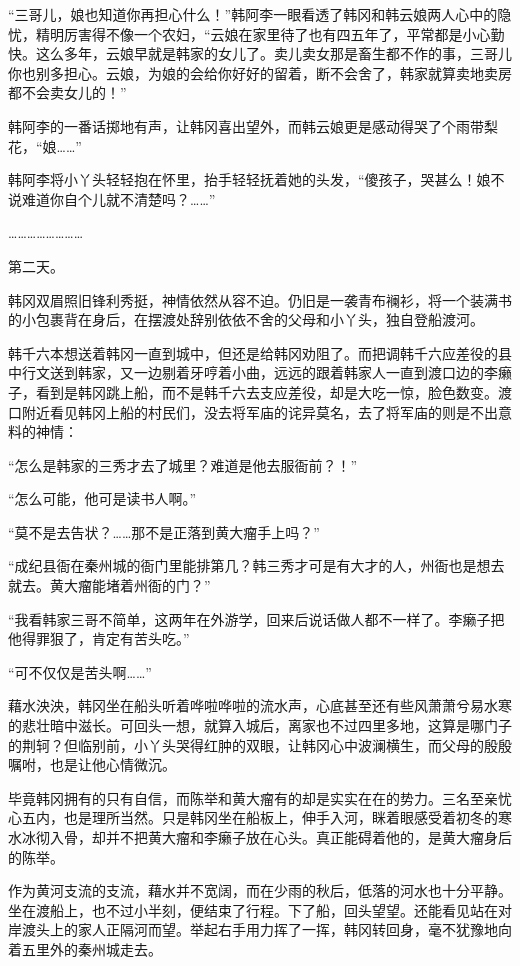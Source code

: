 “三哥儿，娘也知道你再担心什么！”韩阿李一眼看透了韩冈和韩云娘两人心中的隐忧，精明厉害得不像一个农妇，“云娘在家里待了也有四五年了，平常都是小心勤快。这么多年，云娘早就是韩家的女儿了。卖儿卖女那是畜生都不作的事，三哥儿你也别多担心。云娘，为娘的会给你好好的留着，断不会舍了，韩家就算卖地卖房都不会卖女儿的！”

韩阿李的一番话掷地有声，让韩冈喜出望外，而韩云娘更是感动得哭了个雨带梨花，“娘……”

韩阿李将小丫头轻轻抱在怀里，抬手轻轻抚着她的头发，“傻孩子，哭甚么！娘不说难道你自个儿就不清楚吗？……”

……………………

第二天。

韩冈双眉照旧锋利秀挺，神情依然从容不迫。仍旧是一袭青布襕衫，将一个装满书的小包裹背在身后，在摆渡处辞别依依不舍的父母和小丫头，独自登船渡河。

韩千六本想送着韩冈一直到城中，但还是给韩冈劝阻了。而把调韩千六应差役的县中行文送到韩家，又一边剔着牙哼着小曲，远远的跟着韩家人一直到渡口边的李癞子，看到是韩冈跳上船，而不是韩千六去支应差役，却是大吃一惊，脸色数变。渡口附近看见韩冈上船的村民们，没去将军庙的诧异莫名，去了将军庙的则是不出意料的神情：

“怎么是韩家的三秀才去了城里？难道是他去服衙前？！”

“怎么可能，他可是读书人啊。”

“莫不是去告状？……那不是正落到黄大瘤手上吗？”

“成纪县衙在秦州城的衙门里能排第几？韩三秀才可是有大才的人，州衙也是想去就去。黄大瘤能堵着州衙的门？”

“我看韩家三哥不简单，这两年在外游学，回来后说话做人都不一样了。李癞子把他得罪狠了，肯定有苦头吃。”

“可不仅仅是苦头啊……”

藉水泱泱，韩冈坐在船头听着哗啦哗啦的流水声，心底甚至还有些风萧萧兮易水寒的悲壮暗中滋长。可回头一想，就算入城后，离家也不过四里多地，这算是哪门子的荆轲？但临别前，小丫头哭得红肿的双眼，让韩冈心中波澜横生，而父母的殷殷嘱咐，也是让他心情微沉。

毕竟韩冈拥有的只有自信，而陈举和黄大瘤有的却是实实在在的势力。三名至亲忧心五内，也是理所当然。只是韩冈坐在船板上，伸手入河，眯着眼感受着初冬的寒水冰彻入骨，却并不把黄大瘤和李癞子放在心头。真正能碍着他的，是黄大瘤身后的陈举。

作为黄河支流的支流，藉水并不宽阔，而在少雨的秋后，低落的河水也十分平静。坐在渡船上，也不过小半刻，便结束了行程。下了船，回头望望。还能看见站在对岸渡头上的家人正隔河而望。举起右手用力挥了一挥，韩冈转回身，毫不犹豫地向着五里外的秦州城走去。

